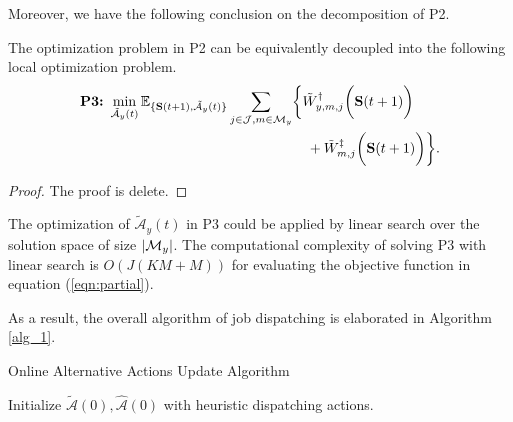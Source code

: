 Moreover, we have the following conclusion on the decomposition of P2.
\begin{lemma}[]
    The optimization problem in P2 can be equivalently decoupled into the following local optimization problem.
    {\small
    \begin{align}
        \textbf{P3:}~
        \min_{ \tilde{\mathcal{A}}_{y}(t) }
        \mathbb{E}_{\set{ \Stat(t+1), \tilde{\mathcal{A}}_{y}(t) }}
        &\sum_{j\in\jSpace,m\in\esSet_{y}} \Brace{
            \tilde{W}^{\AP}_{y,m,j}\Paren{\Stat(t+1)}
            \nonumber\\
            &~~~~~~~~~~~~~~~~~+\tilde{W}^{\ES}_{m,j}\Paren{\Stat(t+1)}
        }.
        \label{eqn:partial}
    \end{align}
    }
\end{lemma}
\begin{proof}
    The proof is delete.
\end{proof}

The optimization of $\tilde{\mathcal{A}}_{y}(t)$ in P3 could be applied by linear search over the solution space of size $|\mathcal{M}_{y}|$.
The computational complexity of solving P3 with linear search is $O(J(KM+M))$ for evaluating the objective function in equation (\ref{eqn:partial}).

As a result, the overall algorithm of job dispatching is elaborated in Algorithm \ref{alg_1}.
\begin{algorithm}[h]
    \caption{Online Alternative Actions Update Algorithm}\label{alg_1}
    \DontPrintSemicolon %

    Initialize $\tilde{\mathcal{A}}(0),\hat{\mathcal{A}}(0)$ with heuristic dispatching actions.\;
\end{algorithm}

